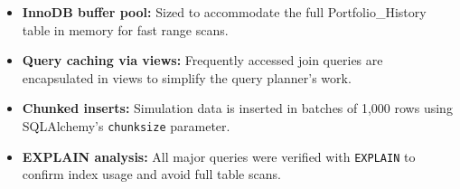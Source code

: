 \begin{itemize}
    \item \textbf{InnoDB buffer pool:} Sized to accommodate the full Portfolio\_History table in memory for fast range scans.
    \item \textbf{Query caching via views:} Frequently accessed join queries are encapsulated in views to simplify the query planner's work.
    \item \textbf{Chunked inserts:} Simulation data is inserted in batches of 1,000 rows using SQLAlchemy's \texttt{chunksize} parameter.
    \item \textbf{EXPLAIN analysis:} All major queries were verified with \texttt{EXPLAIN} to confirm index usage and avoid full table scans.
\end{itemize}
